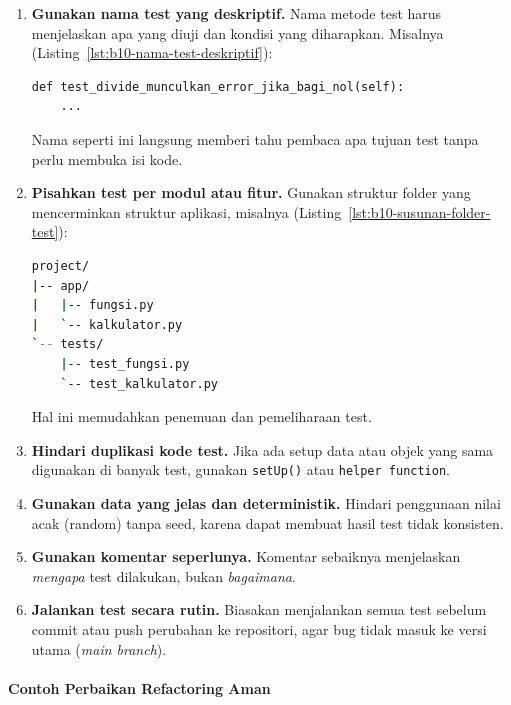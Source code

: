 \begin{enumerate}
    \item \textbf{Gunakan nama test yang deskriptif.}  
    Nama metode test harus menjelaskan apa yang diuji dan kondisi yang diharapkan.  
    Misalnya (Listing~\ref{lst:b10-nama-test-deskriptif}):
\begin{lstlisting}[style=PythonStyle, caption={Contoh nama test yang deskriptif}, label={lst:b10-nama-test-deskriptif}]
def test_divide_munculkan_error_jika_bagi_nol(self):
    ...
\end{lstlisting}
    Nama seperti ini langsung memberi tahu pembaca apa tujuan test tanpa perlu membuka isi kode.

    \item \textbf{Pisahkan test per modul atau fitur.}  
    Gunakan struktur folder yang mencerminkan struktur aplikasi, misalnya (Listing~\ref{lst:b10-susunan-folder-test}):
\begin{lstlisting}[language=bash, caption={Susunan folder kode dan test}, label={lst:b10-susunan-folder-test}]
project/
|-- app/
|   |-- fungsi.py
|   `-- kalkulator.py
`-- tests/
    |-- test_fungsi.py
    `-- test_kalkulator.py
\end{lstlisting}
    Hal ini memudahkan penemuan dan pemeliharaan test.

    \item \textbf{Hindari duplikasi kode test.}  
    Jika ada setup data atau objek yang sama digunakan di banyak test, gunakan \texttt{setUp()} atau \texttt{helper function}.

    \item \textbf{Gunakan data yang jelas dan deterministik.}  
    Hindari penggunaan nilai acak (random) tanpa seed, karena dapat membuat hasil test tidak konsisten.

    \item \textbf{Gunakan komentar seperlunya.}  
    Komentar sebaiknya menjelaskan \textit{mengapa} test dilakukan, bukan \textit{bagaimana}.

    \item \textbf{Jalankan test secara rutin.}  
    Biasakan menjalankan semua test sebelum commit atau push perubahan ke repositori, agar bug tidak masuk ke versi utama (\textit{main branch}).
\end{enumerate}

\paragraph{Contoh Perbaikan Refactoring Aman}

